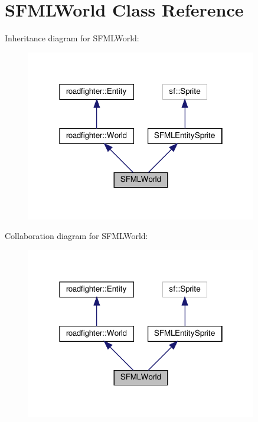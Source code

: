 \hypertarget{classSFMLWorld}{}\section{S\+F\+M\+L\+World Class Reference}
\label{classSFMLWorld}


Inheritance diagram for S\+F\+M\+L\+World\+:\nopagebreak
\begin{figure}[H]
\begin{center}
\leavevmode
\includegraphics[width=286pt]{classSFMLWorld__inherit__graph}
\end{center}
\end{figure}


Collaboration diagram for S\+F\+M\+L\+World\+:\nopagebreak
\begin{figure}[H]
\begin{center}
\leavevmode
\includegraphics[width=286pt]{classSFMLWorld__coll__graph}
\end{center}
\end{figure}

